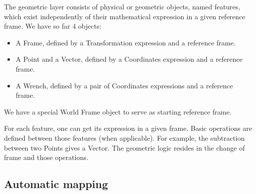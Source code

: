 The geometric layer consists of physical or geometric objects, named features, which exist independently of their mathematical expression in a given reference frame. We have so far 4 objects:
\begin{itemize}
  \item A Frame, defined by a Transformation expression and a reference frame. 
  \item A Point and a Vector, defined by a Coordinates expression and a reference frame. 
  \item A Wrench, defined by a pair of Coordinates expressions and a reference frame.
\end{itemize}
We have a special World Frame object to serve as starting reference frame. 

For each feature, one can get its expression in a given frame.
Basic operations are defined between those features (when applicable). For example, the subtraction between two Points gives a Vector. The geometric logic resides in the change of frame and those operations.


\subsection{Automatic mapping}

